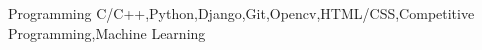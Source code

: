
\vspace{-0.3cm}


\begin{cvskills}


  \cvskill
  {Programming}
  {C/C++,Python,Django,Git,Opencv,HTML/CSS,Competitive Programming,Machine Learning}

\end{cvskills}


